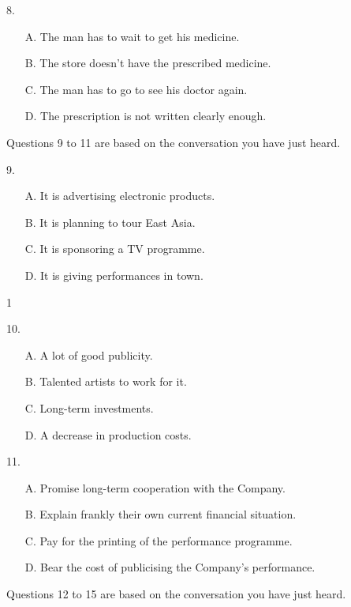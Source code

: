 \documentclass[UTF8,11pt]{ctexart}
\begin{document}
8.


\begin{itemize}[leftmargin=2em,itemsep=.2em,topsep=.4em]\item[A.] The man has to wait to get his medicine.
\item[B.] The store doesn’t have the prescribed medicine.
\item[C.] The man has to go to see his doctor again.
\item[D.] The prescription is not written clearly enough.
\end{itemize}

Questions 9 to 11 are based on the conversation you have just heard.


9.


\begin{itemize}[leftmargin=2em,itemsep=.2em,topsep=.4em]\item[A.] It is advertising electronic products.
\item[B.] It is planning to tour East Asia.
\item[C.] It is sponsoring a TV programme.
\item[D.] It is giving performances in town.
\end{itemize}

1


10.


\begin{itemize}[leftmargin=2em,itemsep=.2em,topsep=.4em]\item[A.] A lot of good publicity.
\item[B.] Talented artists to work for it.
\item[C.] Long-term investments.
\item[D.] A decrease in production costs.
\end{itemize}

11.


\begin{itemize}[leftmargin=2em,itemsep=.2em,topsep=.4em]\item[A.] Promise long-term cooperation with the Company.
\item[B.] Explain frankly their own current financial situation.
\item[C.] Pay for the printing of the performance programme.
\item[D.] Bear the cost of publicising the Company’s performance.
\end{itemize}

Questions 12 to 15 are based on the conversation you have just heard.
\end{document}
